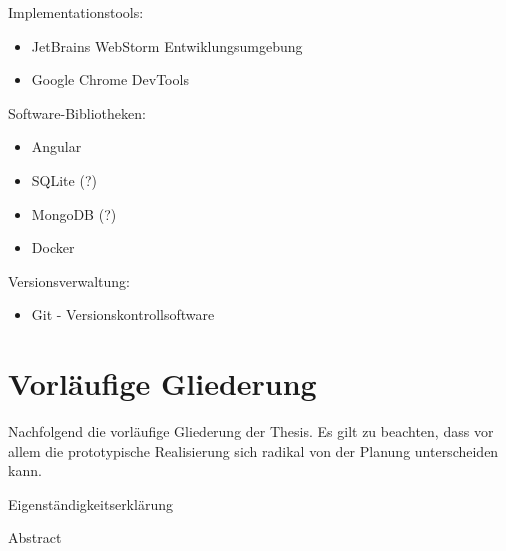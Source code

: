 \documentclass[11pt]{scrartcl}
\begin{document}
	\medskip
	\noindent
	Implementationstools:
	\begin{itemize}
		\item JetBrains WebStorm Entwiklungsumgebung
		\item Google Chrome DevTools
	\end{itemize}
	
	\medskip
	\noindent
	Software-Bibliotheken:
	\begin{itemize}
		\item Angular
		\item SQLite (?)
		\item MongoDB (?)
		\item Docker
	\end{itemize}
	
	\medskip
	\noindent
	Versionsverwaltung:
	\begin{itemize}
		\item Git \@- Versionskontrollsoftware
	\end{itemize}
	
	\pagebreak
	
	\section{\label{sec:gliederung}Vorläufige Gliederung}
	
    Nachfolgend die vorläufige Gliederung der Thesis. Es gilt zu beachten, dass vor allem die prototypische Realisierung sich radikal von der Planung unterscheiden kann.
	
	{\parindent=5mm 
		Eigenständigkeitserklärung
		
		Abstract}
	
\end{document}
